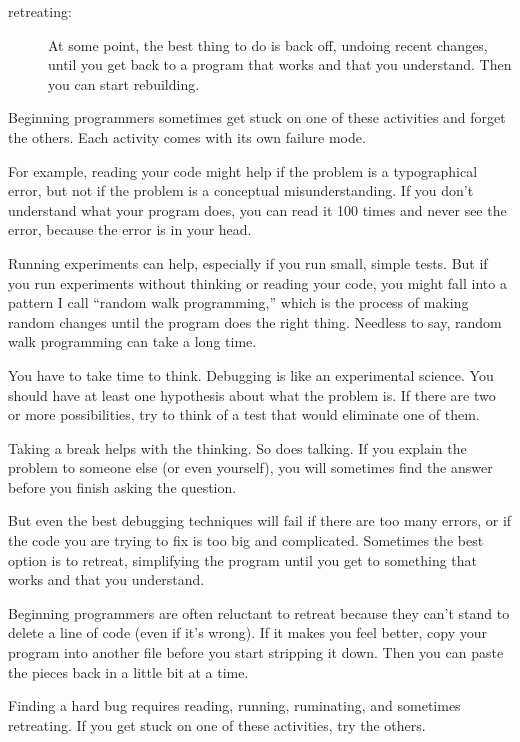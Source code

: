 \documentclass[10pt]{book}
\begin{document}
\begin{CJK}{UTF8}{gbsn}
\begin{description}
\item[retreating:] At some point, the best thing to do is back
off, undoing recent changes, until you get back to a program that
works and that you understand.  Then you can start rebuilding.

\end{description}

Beginning programmers sometimes get stuck on one of these activities
and forget the others.  Each activity comes with its own failure
mode.

For example, reading your code might help if the problem is a
typographical error, but not if the problem is a conceptual
misunderstanding.  If you don't understand what your program does, you
can read it 100 times and never see the error, because the error is in
your head.

Running experiments can help, especially if you run small, simple
tests.  But if you run experiments without thinking or reading your
code, you might fall into a pattern I call ``random walk programming,''
which is the process of making random changes until the program
does the right thing.  Needless to say, random walk programming
can take a long time.

You have to take time to think.  Debugging is like an
experimental science.  You should have at least one hypothesis about
what the problem is.  If there are two or more possibilities, try to
think of a test that would eliminate one of them.

Taking a break helps with the thinking.  So does talking.
If you explain the problem to someone else (or even yourself), you
will sometimes find the answer before you finish asking the question.

But even the best debugging techniques will fail if there are too many
errors, or if the code you are trying to fix is too big and
complicated.  Sometimes the best option is to retreat, simplifying the
program until you get to something that works and that you
understand.

Beginning programmers are often reluctant to retreat because
they can't stand to delete a line of code (even if it's wrong).
If it makes you feel better, copy your program into another file
before you start stripping it down.  Then you can paste the pieces
back in a little bit at a time.

Finding a hard bug requires reading, running, ruminating, and
sometimes retreating.  If you get stuck on one of these activities,
try the others.



\end{CJK}
\end{document}
